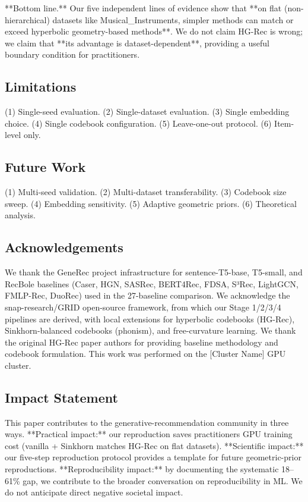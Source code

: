 \documentclass[11pt]{article}
\begin{document}
**Bottom line.** Our five independent lines of evidence show that **on flat (non-hierarchical) datasets like Musical\_Instruments, simpler methods can match or exceed hyperbolic geometry-based methods**. We do not claim HG-Rec is wrong; we claim that **its advantage is dataset-dependent**, providing a useful boundary condition for practitioners.


\subsection{Limitations}
(1) Single-seed evaluation. (2) Single-dataset evaluation. (3) Single embedding choice. (4) Single codebook configuration. (5) Leave-one-out protocol. (6) Item-level only.


\subsection{Future Work}
(1) Multi-seed validation. (2) Multi-dataset transferability. (3) Codebook size sweep. (4) Embedding sensitivity. (5) Adaptive geometric priors. (6) Theoretical analysis.


\subsection{Acknowledgements}
We thank the GeneRec project infrastructure for sentence-T5-base, T5-small, and RecBole baselines (Caser, HGN, SASRec, BERT4Rec, FDSA, S³Rec, LightGCN, FMLP-Rec, DuoRec) used in the 27-baseline comparison. We acknowledge the snap-research/GRID open-source framework, from which our Stage 1/2/3/4 pipelines are derived, with local extensions for hyperbolic codebooks (HG-Rec), Sinkhorn-balanced codebooks (phonism), and free-curvature learning. We thank the original HG-Rec paper authors for providing baseline methodology and codebook formulation. This work was performed on the [Cluster Name] GPU cluster.


\subsection{Impact Statement}
This paper contributes to the generative-recommendation community in three ways. **Practical impact:** our reproduction saves practitioners GPU training cost (vanilla + Sinkhorn matches HG-Rec on flat datasets). **Scientific impact:** our five-step reproduction protocol provides a template for future geometric-prior reproductions. **Reproducibility impact:** by documenting the systematic 18–61\% gap, we contribute to the broader conversation on reproducibility in ML. We do not anticipate direct negative societal impact.
\end{document}
